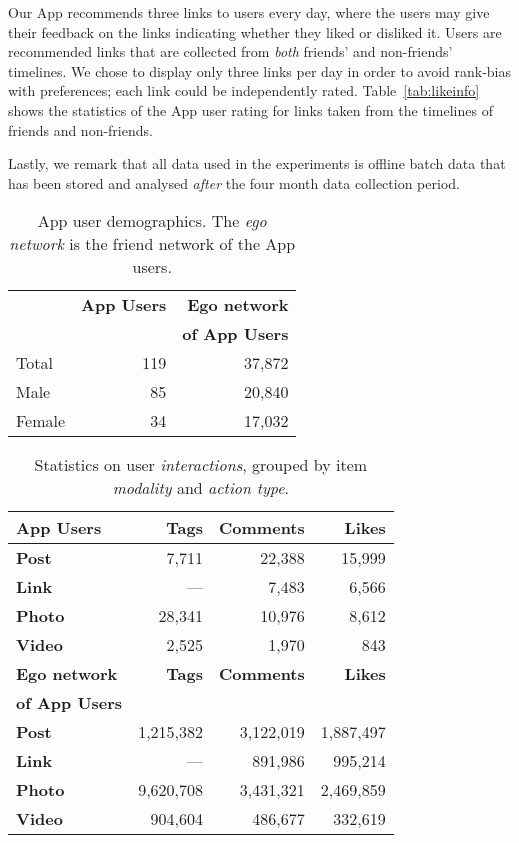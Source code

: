 Our App recommends three links to users every day, where the users may
give their feedback on the links indicating whether they liked or
disliked it. Users are recommended links that are collected
from \emph{both} friends' and non-friends' timelines.  We chose to 
display only three links per day in order to avoid rank-bias with
preferences; each link could be independently rated.
Table~\ref{tab:likeinfo}
shows the statistics of the App user rating for links taken from the
timelines of friends and non-friends.  

Lastly, we remark that all data used in the experiments is offline
batch data that has been stored and analysed \emph{after} the four
month data collection period.
      							
\begin{table}[t!]
\centering
\begin{tabular}{|>{\small}l|>{\small}r|>{\small}r|}
\hline
& \textbf{App Users} & \textbf{Ego network} \\
& & \textbf{of App Users} \\
\hline
Total & 119 & 37,872 \\
\hline \hline
Male & 85 & 20,840 \\
\hline
Female & 34 & 17,032 \\
\hline
\end{tabular}
\caption{App user demographics.  The \emph{ego network} is the friend
network of the App users.}
\label{tab:demographics}
\end{table}

\begin{table}[t!]
\centering
\begin{tabular}{|>{\small}l|>{\small}r|>{\small}r|>{\small}r|}
\hline
\textbf{App Users} & \textbf{Tags} & \textbf{Comments} & \textbf{Likes} \\
\hline
\textbf{Post} & 7,711 & 22,388 & 15,999 \\
\hline
\textbf{Link}  & --- & 7,483 & 6,566 \\
\hline
\textbf{Photo} & 28,341 & 10,976 & 8,612 \\
\hline
\textbf{Video} & 2,525 & 1,970 & 843 \\
\hline
\hline
\textbf{Ego network} & \textbf{Tags} & \textbf{Comments} & \textbf{Likes} \\
\textbf{of App Users}  & & & \\
\hline
\textbf{Post} & 1,215,382 & 3,122,019 & 1,887,497 \\
\hline
\textbf{Link} & --- & 891,986 & 995,214 \\
\hline
\textbf{Photo} & 9,620,708 & 3,431,321 & 2,469,859 \\
\hline
\textbf{Video} & 904,604 & 486,677 & 332,619 \\
\hline
\end{tabular}
\caption{Statistics on user {\em interactions}, grouped by item {\em modality} and {\em action type}.}
\label{tab:interactions}
\end{table}

